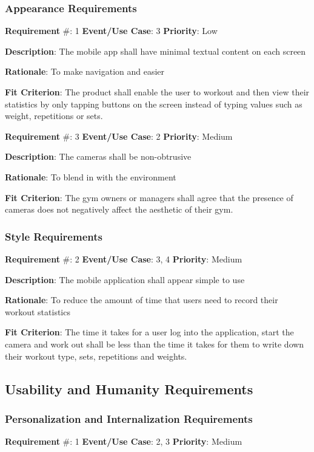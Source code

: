 \documentclass{article}
\newcommand\tab{\hspace*{2cm}}
\begin{document}
\subsubsection{Appearance Requirements}
\textbf{Requirement} \#: 1 \tab \textbf{Event/Use Case}: 3 \tab \textbf{Priority}: Low

\textbf{Description}: The mobile app shall have minimal textual content on each screen

\textbf{Rationale}: To make navigation and easier

\textbf{Fit Criterion}: The product shall enable the user to workout and then view their statistics by only tapping buttons on the screen instead of typing values such as weight, repetitions or sets.

\medskip


\textbf{Requirement} \#: 3 \tab \textbf{Event/Use Case}: 2 \tab \textbf{Priority}: Medium

\textbf{Description}: The cameras shall be non-obtrusive

\textbf{Rationale}: To blend in with the environment

\textbf{Fit Criterion}: The gym owners or managers shall agree that the presence of cameras does not negatively affect the aesthetic of their gym.

\medskip

\subsubsection{Style Requirements}

\textbf{Requirement} \#: 2 \tab \textbf{Event/Use Case}: 3, 4 \tab \textbf{Priority}: Medium

\textbf{Description}: The mobile application shall appear simple to use

\textbf{Rationale}: To reduce the amount of time that users need to record their workout statistics

\textbf{Fit Criterion}: The time it takes for a user log into the application, start the camera and work out shall be less than the time it takes for them to write down their workout type, sets, repetitions and weights.

\medskip

\subsection{Usability and Humanity Requirements}

\subsubsection{Personalization and Internalization Requirements}
\textbf{Requirement} \#: 1 \tab \textbf{Event/Use Case}: 2, 3 \tab \textbf{Priority}: Medium
\end{document}

